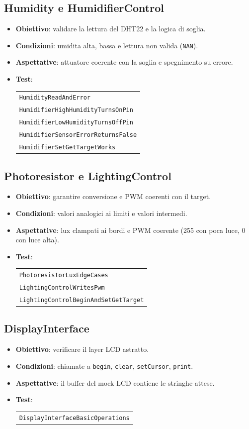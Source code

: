 \subsection{Humidity e HumidifierControl}
\begin{itemize}
  \item \textbf{Obiettivo}: validare la lettura del DHT22 e la logica di soglia.
  \item \textbf{Condizioni}: umidita alta, bassa e lettura non valida (\texttt{NAN}).
  \item \textbf{Aspettative}: attuatore coerente con la soglia e spegnimento su errore.
  \item \textbf{Test}:
  \begin{tabular}[t]{@{}l@{}}
    \texttt{HumidityReadAndError}\\
    \texttt{HumidifierHighHumidityTurnsOnPin}\\
    \texttt{HumidifierLowHumidityTurnsOffPin}\\
    \texttt{HumidifierSensorErrorReturnsFalse}\\
    \texttt{HumidifierSetGetTargetWorks}
  \end{tabular}
\end{itemize}

\subsection{Photoresistor e LightingControl}
\begin{itemize}
  \item \textbf{Obiettivo}: garantire conversione e PWM coerenti con il target.
  \item \textbf{Condizioni}: valori analogici ai limiti e valori intermedi.
  \item \textbf{Aspettative}: lux clampati ai bordi e PWM coerente (255 con poca luce, 0 con luce alta).
  \item \textbf{Test}:
  \begin{tabular}[t]{@{}l@{}}
    \texttt{PhotoresistorLuxEdgeCases}\\
    \texttt{LightingControlWritesPwm}\\
    \texttt{LightingControlBeginAndSetGetTarget}
  \end{tabular}
\end{itemize}

\subsection{DisplayInterface}
\begin{itemize}
  \item \textbf{Obiettivo}: verificare il layer LCD astratto.
  \item \textbf{Condizioni}: chiamate a \texttt{begin}, \texttt{clear}, \texttt{setCursor}, \texttt{print}.
  \item \textbf{Aspettative}: il buffer del mock LCD contiene le stringhe attese.
  \item \textbf{Test}:
  \begin{tabular}[t]{@{}l@{}}
    \texttt{DisplayInterfaceBasicOperations}
  \end{tabular}
\end{itemize}

